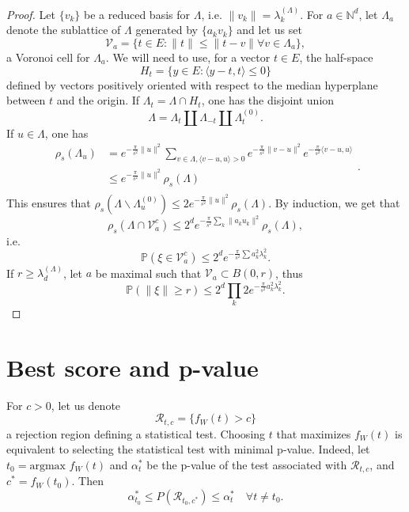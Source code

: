 \begin{proof}
Let $\{v_k\}$ be a reduced basis for $\Lambda$, i.e. $\|v_k\| = \lambda_k^{(\Lambda)}$. For $a\in \mathbb N^d$, let $\Lambda_a$ denote the sublattice of $\Lambda$ generated by $\{a_kv_k\}$  and let us set 
$$\mathcal V_a = \{t\in E : \|t\|\leq \|t-v\| \forall v\in \Lambda_a\}, $$
a Voronoi cell for $\Lambda_a$. We will need to use, for a vector $t\in E$, the half-space 
$$H_t = \{y \in E : \langle y-t , t\rangle \leq 0  \}$$ 
defined by vectors positively oriented with respect to the median hyperplane between $t$ and the origin. If $\Lambda_{t} =\Lambda\cap H_t$, one has the disjoint union
$$\Lambda = \Lambda_t \coprod \Lambda_{-t} \coprod \Lambda_t^{(0)}.$$
If $u\in \Lambda$, one has
\[\begin{split}
\rho_s(\Lambda_u) & = e^{-\frac{\pi}{s^2} \|u\|^2 }\sum_{v\in \Lambda , \langle v-u ,u\rangle >0 } e^{-\frac{\pi}{s^2} \|v - u \|^2}e^{-\frac{\pi}{s^2} \langle v-u,u\rangle} \\
		& \leq  e^{-\frac{\pi}{s^2} \|u\|^2 } \rho_s(\Lambda) \\ 
\end{split}.\]
This ensures that $\rho_s(\Lambda \backslash \Lambda_u^{(0)}) \leq 2e^{-\frac{\pi}{s^2} \|u\|^2} \rho_s(\Lambda) $. By induction, we get that
$$\rho_s(\Lambda \cap \mathcal V_a^c) \leq 2^d  e^{-\frac{\pi}{s^2} \sum_{k} \|a_ku_k\|^2}\rho_s(\Lambda) ,$$
i.e.
$$\mathbb P(\xi \in \mathcal V_a^c) \leq  2^d e^{-\frac{\pi}{s^2} \sum a_k^2\lambda_k^2} .$$
If $r\geq \lambda_d^{(\Lambda)}$, let $a$ be maximal such that $\mathcal V_a\subset B(0,r)$, thus
$$\mathbb P(\| \xi \| \geq r) \leq  2^d\prod_{k} 2e^{-\frac{\pi}{s^2} a_k^2\lambda_k^2} .$$
\end{proof}

\section{Best score and p-value} %

For $c >0 $, let us denote 
$$\mathcal R_{t,c} = \{f_W(t) > c\}$$
a rejection region defining a statistical test. Choosing $t$ that maximizes $f_W(t)$ is equivalent to selecting the statistical test with minimal p-value. Indeed, let $t_0 = \text{argmax }f_W(t)$ and $\alpha^*_t$ be the p-value of the test associated with $\mathcal R_{t,c}$, and $c^* = f_W(t_0)$. Then 
$$\alpha^*_{t_0} \leq  P(\mathcal R_{t_0,c^*} ) \leq \alpha^*_t \quad \forall t\neq t_0.$$


